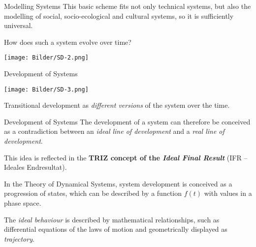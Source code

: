 \documentclass{beamer}
\begin{document}
\begin{frame}{Modelling Systems}
  This basic scheme fits not only technical systems, but also the modelling of
  social, socio-ecological and cultural systems, so it is sufficiently
  universal.

How does such a system evolve over time?
\begin{center}
  \texttt{[image: Bilder/SD-2.png]}
\end{center}
\end{frame}

\begin{frame}{Development of Systems}
\begin{center}
  \texttt{[image: Bilder/SD-3.png]}
\end{center}
Transitional development as \emph{different versions} of the system over the
time.
\end{frame}


\begin{frame}{Development of Systems}
  The development of a system can therefore be conceived as a contradiction
  between an \emph{ideal line of development} and a \emph{real line of
    development}.

This idea is reflected in the \textbf{TRIZ concept of the \emph{Ideal Final
    Result}} (IFR -- Ideales Endresultat).

In the Theory of Dynamical Systems, system development is conceived as a
progression of states, which can be described by a function $f(t)$ with values
in a phase space.

The \emph{ideal behaviour} is described by mathematical relationships, such as
differential equations of the laws of motion and geometrically displayed as
\emph{trajectory}. 

\end{frame}
\end{document}
